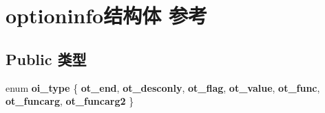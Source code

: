 \hypertarget{structoptioninfo}{}\section{optioninfo结构体 参考}
\label{structoptioninfo}
\subsection*{Public 类型}
\begin{DoxyCompactItemize}
\item 
\mbox{\label{structoptioninfo_a0bd4f498353db00f97e973f65b77a206}} 
enum {\bfseries oi\+\_\+type} \{ \newline
{\bfseries ot\+\_\+end}, 
{\bfseries ot\+\_\+desconly}, 
{\bfseries ot\+\_\+flag}, 
{\bfseries ot\+\_\+value}, 
\newline
{\bfseries ot\+\_\+func}, 
{\bfseries ot\+\_\+funcarg}, 
{\bfseries ot\+\_\+funcarg2}
 \}
\end{DoxyCompactItemize}

